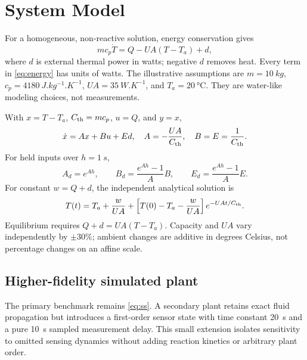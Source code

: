 \section{System Model}\label{sec:model}
For a homogeneous, non-reactive solution, energy conservation gives
\begin{equation}
m c_p \dot T=Q-UA(T-T_a)+d, \label{eq:energy}
\end{equation}
where $d$ is external thermal power in watts; negative $d$ removes heat. Every term in \cref{eq:energy} has units of watts. The illustrative assumptions are $m=\SI{10}{kg}$, $c_p=\SI{4180}{J.kg^{-1}.K^{-1}}$, $UA=\SI{35}{W.K^{-1}}$, and $T_a=\SI{20}{\celsius}$. They are water-like modeling choices, not measurements.

With $x=T-T_a$, $C_{\rm th}=mc_p$, $u=Q$, and $y=x$,
\begin{equation}
\dot x=Ax+Bu+Ed,\quad A=-\frac{UA}{C_{\rm th}},\quad B=E=\frac{1}{C_{\rm th}}. \label{eq:ss}
\end{equation}
For held inputs over $h=\SI{1}{s}$,
\begin{equation}
A_d=e^{Ah},\qquad B_d=\frac{e^{Ah}-1}{A}B,\qquad E_d=\frac{e^{Ah}-1}{A}E. \label{eq:zoh}
\end{equation}
For constant $w=Q+d$, the independent analytical solution is
\begin{equation}
T(t)=T_a+\frac{w}{UA}+\left[T(0)-T_a-\frac{w}{UA}\right]e^{-UA t/C_{\rm th}}. \label{eq:analytic}
\end{equation}
Equilibrium requires $Q+d=UA(T-T_a)$. Capacity and $UA$ vary independently by $\pm30\%$; ambient changes are additive in degrees Celsius, not percentage changes on an affine scale.

\subsection{Higher-fidelity simulated plant}
The primary benchmark remains \cref{eq:ss}. A secondary plant retains exact fluid propagation but introduces a first-order sensor state with time constant \SI{20}{s} and a pure \SI{10}{s} sampled measurement delay. This small extension isolates sensitivity to omitted sensing dynamics without adding reaction kinetics or arbitrary plant order.

